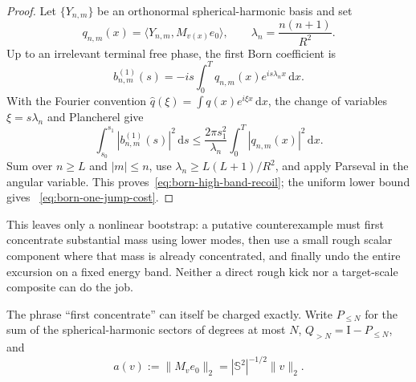 \documentclass[11pt]{article}
\newcommand{\Id}{\mathrm I}
\newcommand{\dd}{\,\mathrm d}
\theoremstyle{definition}
\theoremstyle{remark}
\begin{document}
\begin{proof}
Let $\{Y_{n,m}\}$ be an orthonormal spherical-harmonic basis and set
\begin{equation}
 q_{n,m}(x)=\langle Y_{n,m},M_{v(x)}e_0\rangle,
 \qquad \lambda_n=\frac{n(n+1)}{R^2}.
\end{equation}
Up to an irrelevant terminal free phase, the first Born coefficient is
\begin{equation}
 b_{n,m}^{(1)}(s)
 =-is\int_0^Tq_{n,m}(x)e^{is\lambda_nx}\dd x.
\end{equation}
With the Fourier convention
$\widehat q(\xi)=\int q(x)e^{i\xi x}\dd x$, the change of variables
$\xi=s\lambda_n$ and Plancherel give
\begin{equation}
 \int_{s_0}^{s_1}|b_{n,m}^{(1)}(s)|^2\dd s
 \leq \frac{2\pi s_1^2}{\lambda_n}
 \int_0^T|q_{n,m}(x)|^2\dd x.
\end{equation}
Sum over $n\geq L$ and $|m|\leq n$, use
$\lambda_n\geq L(L+1)/R^2$, and apply Parseval in the angular variable.  This
proves~\eqref{eq:born-high-band-recoil}; the uniform lower bound gives
~\eqref{eq:born-one-jump-cost}.
\end{proof}

This leaves only a nonlinear bootstrap: a putative counterexample must first
concentrate substantial mass using lower modes, then use a small rough scalar
component where that mass is already concentrated, and finally undo the
entire excursion on a fixed energy band.  Neither a direct rough kick nor a
target-scale composite can do the job.

The phrase ``first concentrate'' can itself be charged exactly.  Write
$P_{\leq N}$ for the sum of the spherical-harmonic sectors of degrees at most
$N$, $Q_{>N}=\Id-P_{\leq N}$, and
\begin{equation}
 a(v):=\|M_ve_0\|_2=|\mathbb S^2|^{-1/2}\|v\|_2.
 \label{eq:scalar-charged-amplitude}
\end{equation}
\end{document}
